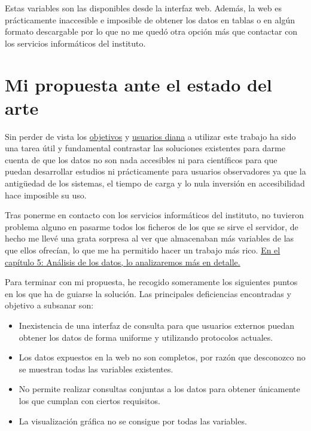 Estas variables son las disponibles desde la interfaz web. Además, la web es prácticamente
inaccesible e imposible de obtener los datos en tablas o en algún formato descargable por
lo que no me quedó otra opción más que contactar con los servicios informáticos del
instituto.


\section{Mi propuesta ante el estado del arte}

Sin perder de vista los \hyperref[sec:obj]{objetivos} y \hyperref[sec:usu]{usuarios diana}
a utilizar este trabajo ha sido una tarea útil y fundamental contrastar las soluciones
existentes para darme cuenta de que los datos no son nada accesibles ni para científicos
para que puedan desarrollar estudios ni prácticamente para usuarios observadores ya que la
antigüedad de los sistemas, el tiempo de carga y lo nula inversión en accesibilidad hace
imposible su uso.

Tras ponerme en contacto con los servicios informáticos del instituto, no tuvieron
problema alguno en pasarme todos los ficheros de los que se sirve el servidor, de hecho me
llevé una grata sorpresa al ver que almacenaban más variables de las que ellos ofrecían,
lo que me ha permitido hacer un trabajo más rico. \hyperref[cap:5]{En el capítulo 5:
Análisis de los datos, lo analizaremos más en detalle.}


Para terminar con mi propuesta, he recogido someramente los siguientes puntos en los que
ha de guiarse la solución. Las principales deficiencias encontradas y objetivo a subsanar
son:
\begin{itemize}
    \item Inexistencia de una interfaz de consulta para que usuarios externos puedan
    obtener los datos de forma uniforme y utilizando protocolos actuales.
    \item Los datos expuestos en la web no son completos, por razón que desconozco no se
    muestran todas las variables existentes.
    \item No permite realizar consultas conjuntas a los datos para obtener únicamente
    los que cumplan con ciertos requisitos.
    \item La visualización gráfica no se consigue por todas las variables.
\end{itemize}
